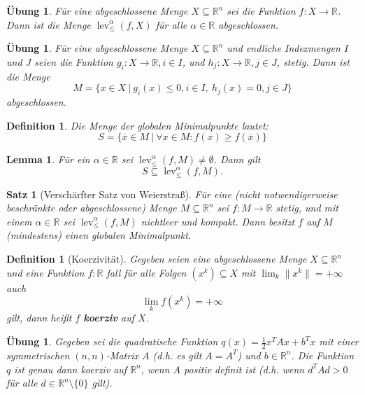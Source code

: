 \documentclass[11pt]{scrreprt}
\newcounter{thm}
\numberwithin{thm}{section}
\newtheorem{definition}[thm]{Definition}
\newtheorem{lemma}[thm]{Lemma}
\newtheorem{satz}[thm]{Satz}
\newtheorem{uebung}[thm]{Übung}
\newtheorem*{definition*}{Definition}
\begin{document}
\setcounter{thm}{9}

\begin{uebung}
	Für eine abgeschlossene Menge $X \subseteq \mathbb{R}^n$ sei die Funktion $f \colon X \rightarrow \mathbb{R}$. Dann ist die Menge $\operatorname{lev}_{\leq}^{\alpha}(f, X)$ für alle $\alpha \in \mathbb{R}$ abgeschlossen.	
\end{uebung}

\begin{uebung}
	Für eine abgeschlossene Menge $X \subseteq \mathbb{R}^n$ und endliche Indexmengen $I$ und $J$ seien die Funktion $g_i \colon X \rightarrow \mathbb{R}, i \in I$, und $h_j \colon X \rightarrow \mathbb{R}, j \in J$, stetig. Dann ist die Menge 
		$$ M = \big\{ x \in X ~|~g_i(x) \leq 0, i \in I, ~ h_j(x) = 0, j \in J \big\} $$
		abgeschlossen.	
\end{uebung}

\begin{definition*}
	Die Menge der globalen Minimalpunkte lautet:
	$$ S = \big\{ \overline{x} \in M ~|~ \forall x \in M: f(x) \geq f(\overline{x}) \big\} $$
\end{definition*}

\begin{lemma}
	Für ein $\alpha \in \mathbb{R}$ sei $\operatorname{lev}_{\leq}^{\alpha}(f, M) \neq \emptyset$. Dann gilt 
	$$ S \subseteq \operatorname{lev}_{\leq}^{\alpha}(f, M). $$
\end{lemma}

\begin{satz}[Verschärfter Satz von Weierstraß]
	Für eine (nicht notwendigerweise beschränkte oder abgeschlossene) Menge $M \subseteq \mathbb{R}^n$ sei $f \colon M \rightarrow \mathbb{R}$ stetig, und mit einem $\alpha \in \mathbb{R}$ sei $\operatorname{lev}_{\leq}^{\alpha}(f, M)$ nichtleer und kompakt. Dann besitzt $f$ auf $M$ (mindestens) einen globalen Minimalpunkt.
\end{satz}

\setcounter{thm}{20}

\begin{definition}[Koerzivität]
	Gegeben seien eine abgeschlossene Menge $X \subseteq \mathbb{R}^n$ und eine Funktion $f \colon \mathbb{R}$ fall für alle Folgen $(x^k) \subseteq X$ mit $\lim_k \| x^k \| = +\infty$ auch
	$$ \lim_k f(x^k) = +\infty $$
	gilt, dann heißt $f$ \textbf{koerziv} auf $X$.
\end{definition}

\setcounter{thm}{23}

\begin{uebung}
		Gegeben sei die quadratische Funktion $q(x) = \frac{1}{2} x^T A x + b^T x$ mit einer symmetrischen $(n, n)$-Matrix $A$ (d.h. es gilt $A = A^T$) und $b \in \mathbb{R}^n$. Die Funktion $q$ ist genau dann koerziv auf $\mathbb{R}^n$, wenn $A$ positiv definit ist (d.h. wenn $d^T A d > 0$ für alle $d\in \mathbb{R}^n \setminus \{ 0 \}$ gilt).
\end{uebung}
\end{document}
